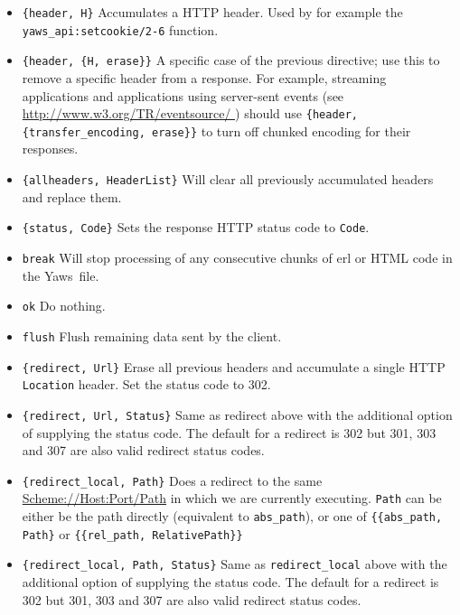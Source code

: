 \documentclass[11pt,oneside,english]{book}
\newcommand{\Yaws}            %
        {{\sc Yaws}}
\begin{document}
\begin{itemize}
\item \verb+{header, H}+ Accumulates a HTTP header. Used by for
  example the \verb+yaws_api:setcookie/2-6+ function.

\item \verb+{header, {H, erase}}+ A specific case of the previous
  directive; use this to remove a specific header from a response. For
  example, streaming applications and applications using server-sent events
  (see \url{http://www.w3.org/TR/eventsource/ }) should use
  \verb+{header, {transfer_encoding, erase}}+ to turn off chunked encoding
  for their responses.

\item \verb+{allheaders, HeaderList}+ Will clear all previously
  accumulated headers and replace them.

\item \verb+{status, Code}+ Sets the response HTTP status code to
  \verb+Code+.

\item \verb+break+ Will stop processing of any consecutive chunks of
  erl or HTML code in the \Yaws\ file.

\item \verb+ok+ Do nothing.

\item \verb+flush+ Flush remaining data sent by the client.

\item \verb+{redirect, Url}+ Erase all previous headers and accumulate
  a single HTTP \verb+Location+ header. Set the status code to 302.

\item \verb+{redirect, Url, Status}+ Same as redirect above with the
  additional option of supplying the status code. The default for a
  redirect is 302 but 301, 303 and 307 are also valid redirect status
  codes.

\item \verb+{redirect_local, Path}+ Does a redirect to the same
  \url{Scheme://Host:Port/Path} in which we are currently
  executing. \verb+Path+ can be either be the path directly
  (equivalent to \verb+abs_path+), or one of \verb+{{abs_path, Path}+
  or \verb+{{rel_path, RelativePath}}+

\item \verb+{redirect_local, Path, Status}+ Same as
  \verb+redirect_local+ above with the additional option of supplying
  the status code. The default for a redirect is 302 but 301, 303 and
  307 are also valid redirect status codes.


\end{itemize}
\end{document}
